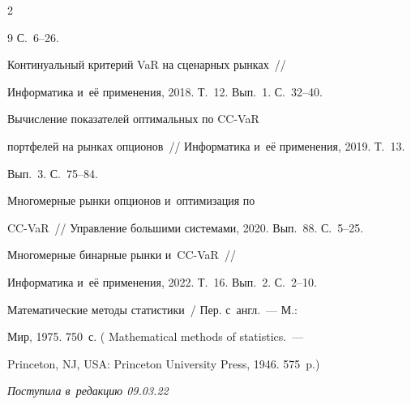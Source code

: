 \begin{multicols}{2}
{{\begin{thebibliography}{9}
С.~6--26.




   Континуальный критерий VaR на сценарных рынках~// 


Информатика и~её применения, 2018. Т.~12. Вып.~1. С.~32--40. 




   Вычисление показателей оптимальных по CC-VaR 


портфелей на рынках опционов~// Информатика и~её применения, 2019. Т.~13. 


Вып.~3. С.~75--84. 




   Многомерные рынки опционов и~оптимизация по  


CC-VaR~// Управ\-ле\-ние большими сис\-те\-ма\-ми, 2020. Вып.~88. С.~5--25.




   Многомерные бинарные рынки и~CC-VaR~// 


Информатика и~её применения, 2022. Т.~16. Вып.~2. С.~2--10.




   Математические методы статистики~/ Пер. с~англ.~--- М.: 


Мир, 1975. 750~с. ( Mathematical methods of statistics.~--- 


Princeton, NJ, USA: Princeton University Press, 1946. 575~p.)


\end{thebibliography}





 }


 }





\end{multicols}





\vspace*{-6pt}





\hfill{\small\textit{Поступила в~редакцию 09.03.22}}





\vspace*{8pt}





